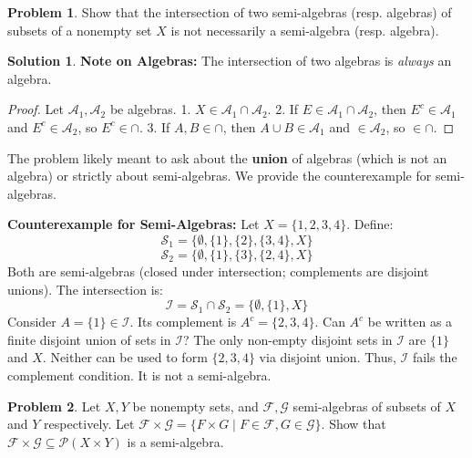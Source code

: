 \documentclass[11pt]{article}
\theoremstyle{definition}
\newtheorem{problem}{Problem}
\newtheorem*{solution}{Solution}
\newcommand{\F}{\mathcal{F}}
\newcommand{\G}{\mathcal{G}}
\renewcommand{\S}{\mathcal{S}}
\newcommand{\Pset}{\mathcal{P}}
\begin{document}
\hrulefill

\begin{problem}
Show that the intersection of two semi-algebras (resp. algebras) of subsets of a nonempty set $X$ is not necessarily a semi-algebra (resp. algebra).
\end{problem}

\begin{solution}
\textbf{Note on Algebras:} The intersection of two algebras is \textit{always} an algebra.
\begin{proof}
Let $\mathcal{A}_1, \mathcal{A}_2$ be algebras.
1. $X \in \mathcal{A}_1 \cap \mathcal{A}_2$.
2. If $E \in \mathcal{A}_1 \cap \mathcal{A}_2$, then $E^c \in \mathcal{A}_1$ and $E^c \in \mathcal{A}_2$, so $E^c \in \cap$.
3. If $A, B \in \cap$, then $A \cup B \in \mathcal{A}_1$ and $\in \mathcal{A}_2$, so $\in \cap$.
\end{proof}
The problem likely meant to ask about the \textbf{union} of algebras (which is not an algebra) or strictly about semi-algebras. We provide the counterexample for semi-algebras.

\textbf{Counterexample for Semi-Algebras:}
Let $X = \{1, 2, 3, 4\}$.
Define:
\[ \S_1 = \{\emptyset, \{1\}, \{2\}, \{3, 4\}, X\} \]
\[ \S_2 = \{\emptyset, \{1\}, \{3\}, \{2, 4\}, X\} \]
Both are semi-algebras (closed under intersection; complements are disjoint unions).
The intersection is:
\[ \mathcal{I} = \S_1 \cap \S_2 = \{\emptyset, \{1\}, X\} \]
Consider $A = \{1\} \in \mathcal{I}$. Its complement is $A^c = \{2, 3, 4\}$.
Can $A^c$ be written as a finite disjoint union of sets in $\mathcal{I}$?
The only non-empty disjoint sets in $\mathcal{I}$ are $\{1\}$ and $X$. Neither can be used to form $\{2, 3, 4\}$ via disjoint union.
Thus, $\mathcal{I}$ fails the complement condition. It is not a semi-algebra.
\end{solution}

\hrulefill

\begin{problem}
Let $X, Y$ be nonempty sets, and $\F, \G$ semi-algebras of subsets of $X$ and $Y$ respectively. Let $\F \times \G = \{F \times G \mid F \in \F, G \in \G\}$. Show that $\F \times \G \subseteq \Pset(X \times Y)$ is a semi-algebra.
\end{problem}
\end{document}
